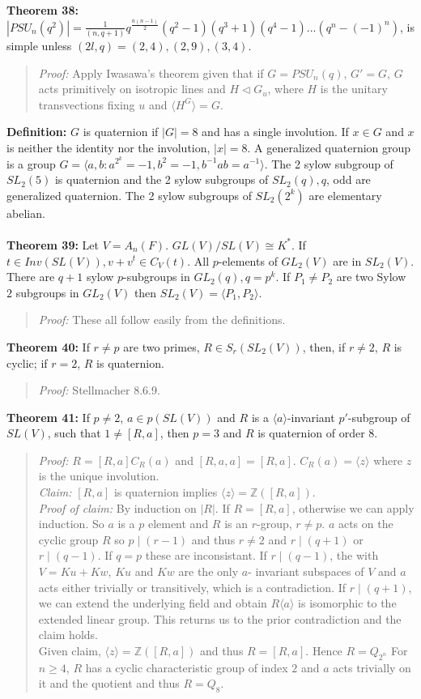 {\bf Theorem 38:}
$|PSU_n(q^2)|= {\frac 1 {(n,q+1)}} q^{\frac {n(n-1)} 2} (q^{2} -1) (q^{3} +1) 
(q^4 -1)...  (q^{n} - (-1)^n)$,
is simple unless $(2l,q)= (2,4), (2,9), (3,4)$.
\begin{quote}
\emph{Proof:}  
Apply Iwasawa's theorem given that if $G= PSU_n(q)$, $G'=G$,
$G$ acts primitively on isotropic lines and $H \lhd G_u$, where $H$ is the unitary
transvections fixing $u$ and $ \langle H^G \rangle = G$.
\end{quote}
{\bf Definition:}  $G$ is quaternion if $|G|=8$ and has a single involution.   If $x \in G$ and $x$ is neither
the identity nor the involution, $|x|=8$.  A generalized quaternion group is a group
$G= \langle a, b: a^{2^k}=-1, b^2 = -1, b^{-1} a b = a^{-1} \rangle$.
The 2 sylow subgroup of $SL_2(5)$ is quaternion and the 2 sylow subgroups of $SL_2(q), q$, odd are generalized quaternion.
The 2 sylow subgroups of $SL_2(2^k)$ are elementary abelian.
\\
\\
{\bf Theorem 39:} Let $V= A_n(F)$.  $GL(V)/SL(V) \cong K^*$.  
If $t \in Inv(SL(V)), v + v^t \in C_V(t)$.
All $p$-elements of $GL_2(V)$ are in $SL_2(V)$.  There are $q+1$ sylow $p$-subgroups in
$GL_2(q), q= p^k$.  If $P_1 \ne P_2$ are two Sylow $2$ subgroups in $GL_2(V)$ then
$SL_2(V)=
\langle
P_1, P_2
\rangle
$.
\begin{quote}
\emph{Proof:}  
These all follow easily from the definitions.
\end{quote}
{\bf Theorem 40:} If $r \ne p$ are two primes, $R \in S_r(SL_2(V))$, then, if $r \ne 2$,
$R$ is cyclic; if $r=2$, $R$ is quaternion.
\begin{quote}
\emph{Proof:}  Stellmacher 8.6.9.
\end{quote}
{\bf Theorem 41:} If $p \ne 2$, $a \in p(SL(V))$ and $R$ is a $ \langle a \rangle $-invariant 
$p'$-subgroup of
$SL(V)$, such that $1 \ne [R,a]$, then $p=3$ and $R$ is quaternion of order $8$.
\begin{quote}
\emph{Proof:}  
$R= [R, a] C_R(a)$ and $[R, a, a] = [R, a]$.  $C_R(a) = \langle z \rangle$ where
$z$ is the unique involution.\\
\emph{Claim:} $[R, a]$ is quaternion implies 
$\langle z \rangle = {\mathbb Z}([R,a])$.
\\
\emph{Proof of claim:} By induction on $|R|$.  If $R = [R,a]$, otherwise we can apply
induction.  So $a$ is a $p$ element and $R$ is an $r$-group, $r \ne p$.  $a$ acts
on the cyclic group $R$ so $p \mid (r-1)$ and thus $r \ne 2$ and $r \mid (q+1)$ or $r \mid (q-1)$.
If $q=p$ these are inconsistant.  If $r \mid (q-1)$, the with $V= Ku + Kw$, $Ku$ and
$Kw$ are the only $a$- invariant subspaces of $V$ and $a$ acts either trivially or transitively,
which is a contradiction.  If $r \mid (q+1)$, we can extend the underlying field and obtain
$R \langle a \rangle$ is isomorphic to the extended linear group.  This returns us to the prior
contradiction and the claim holds.
\\
Given claim, 
$\langle z \rangle = {\mathbb Z}([R,a])$ and thus $R= [R, a]$.  Hence $R= Q_{2^n}$
For $n \ge 4$, $R$ has a cyclic characteristic
group of index $2$ and $a$ acts trivially on it and the quotient and thus $R=Q_8$.
\end{quote}
